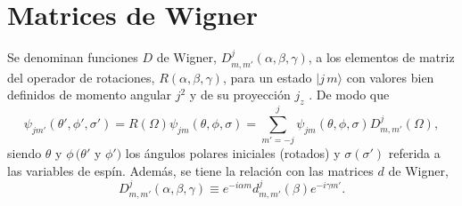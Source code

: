 \section{Matrices de Wigner}
\label{app_matwig}




Se denominan funciones $D$ de Wigner, $D_{m,m'}^j(\alpha,\beta,\gamma)$, a los elementos de matriz del operador de rotaciones, $R(\alpha,\beta,\gamma)$, para un estado $|j\,m\rangle$ con valores bien definidos de momento angular $j^2$ y de su proyección $j_z$ \cite{kutschke1996angular}. De modo que
\begin{equation}
	\psi_{jm'}(\theta',\phi',\sigma') = R(\Omega) \psi_{jm} (\theta,\phi,\sigma) = \sum_{m' = -j}^j  \psi_{jm} (\theta,\phi,\sigma) D_{m,m'}^j(\Omega),
\end{equation}
siendo $\theta$ y $\phi \, (\theta'$ y $\phi')$ los ángulos polares iniciales (rotados) y $\sigma(\sigma')$ referida a las variables de espín. Además, se tiene la relación con las matrices $d$ de Wigner,
\begin{equation}
	D_{m,m'}^j (\alpha,\beta,\gamma) \equiv e^{-i\alpha m} d_{m,m'}^j (\beta) e^{-i\gamma m'}.
\end{equation}



